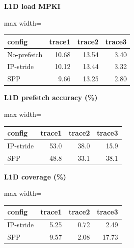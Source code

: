 \documentclass[10pt]{article}
\begin{document}
\begin{center}
\begin{minipage}[t]{0.48\linewidth}\centering
\textbf{L1D load MPKI}\\[3pt]
\begin{adjustbox}{max width=\linewidth}
\begin{tabular}{@{}lrrr@{}}
\toprule
\textbf{config} & \textbf{trace1} & \textbf{trace2} & \textbf{trace3} \\
\midrule
No-prefetch & 10.68 & 13.54 & 3.40 \\
IP-stride & 10.12 & 13.44 & 3.32 \\
SPP & 9.66 & 13.25 & 2.80 \\
\bottomrule
\end{tabular}
\end{adjustbox}
\end{minipage}\hfill
\begin{minipage}[t]{0.48\linewidth}\centering
\textbf{L1D prefetch accuracy (\%)}\\[3pt]
\begin{adjustbox}{max width=\linewidth}
\begin{tabular}{@{}lrrr@{}}
\toprule
\textbf{config} & \textbf{trace1} & \textbf{trace2} & \textbf{trace3} \\
\midrule
IP-stride & 53.0 & 38.0 & 15.9 \\
SPP & 48.8 & 33.1 & 38.1 \\
\bottomrule
\end{tabular}
\end{adjustbox}
\end{minipage}
\end{center}
\medskip
\begin{center}
\begin{minipage}[t]{0.48\linewidth}\centering
\textbf{L1D coverage (\%)}\\[3pt]
\begin{adjustbox}{max width=\linewidth}
\begin{tabular}{@{}lrrr@{}}
\toprule
\textbf{config} & \textbf{trace1} & \textbf{trace2} & \textbf{trace3} \\
\midrule
IP-stride & 5.25 & 0.72 & 2.49 \\
SPP & 9.57 & 2.08 & 17.73 \\
\bottomrule
\end{tabular}
\end{adjustbox}
\end{minipage}
\end{center}
\end{document}
